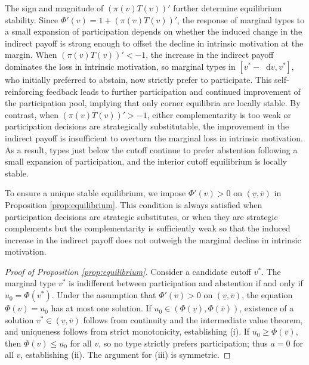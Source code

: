 \documentclass[12pt,notitlepage]{article}
\theoremstyle{plain}
\theoremstyle{plain}
\theoremstyle{definition}
\theoremstyle{definition}
\theoremstyle{assumption}
\theoremstyle{plain}
\theoremstyle{plain}
\theoremstyle{plain}
\theoremstyle{plain}
\theoremstyle{definition}%
\theoremstyle{plain}
\theoremstyle{plain}
\theoremstyle{plain}
\theoremstyle{plain}
\newcommand*\diff{\mathop{}\!\mathrm{d}}
\begin{document}
The sign and magnitude of $(\pi(v)T(v))'$ further determine equilibrium stability. Since $\Phi'(v) = 1+(\pi(v)T(v))'$, the response of marginal types to a small expansion of participation depends on whether the induced change in the indirect payoff is strong enough to offset the decline in intrinsic motivation at the margin. When $(\pi(v)T(v))'<-1$, the increase in the indirect payoff dominates the loss in intrinsic motivation, so marginal types in $[v^*-\diff v,v^*]$, who initially preferred to abstain, now strictly prefer to participate. This self-reinforcing feedback leads to further participation and continued improvement of the participation pool, implying that only corner equilibria are locally stable. By contrast, when $(\pi(v)T(v))'>-1$, either complementarity is too weak or participation decisions are strategically substitutable, the improvement in the indirect payoff is insufficient to overturn the marginal loss in intrinsic motivation. As a result, types just below the cutoff continue to prefer abstention following a small expansion of participation, and the interior cutoff equilibrium is locally stable.

To ensure a unique stable equilibrium, we impose $\Phi'(v)>0$ on $(\underline v,\overline v)$ in Proposition \ref{prop:equilibrium}. This condition is always satisfied when participation decisions are strategic substitutes, or when they are strategic complements but the complementarity is sufficiently weak so that the induced increase in the indirect payoff does not outweigh the marginal decline in intrinsic motivation.

\begin{proof}[Proof of Proposition \ref{prop:equilibrium}]
    Consider a candidate cutoff $v^*$. The marginal type $v^*$ is indifferent between participation and abstention if and only if $u_0 = \Phi(v^*)$. Under the assumption that $\Phi'(v)>0$ on $(\underline v,\overline v)$, the equation $\Phi(v)=u_0$ has at most one solution. If $u_0\in(\Phi(\underline v),\Phi(\overline v))$, existence of a solution $v^*\in(\underline v,\overline v)$ follows from continuity and the intermediate value theorem, and uniqueness follows from strict monotonicity, establishing (i). If $u_0\ge \Phi(\overline v)$, then $\Phi(v)\le u_0$ for all $v$, so no type strictly prefers participation; thus $a=0$ for all $v$, establishing (ii). The argument for (iii) is symmetric.
\end{proof}
\end{document}
